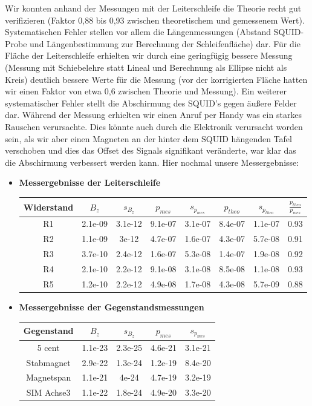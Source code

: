\documentclass[12pt]{article}
\begin{document}
Wir konnten anhand der Messungen mit der Leiterschleife die Theorie recht gut verifizieren (Faktor 0,88 bis 0,93 zwischen theoretischem und gemessenem Wert). Systematischen Fehler stellen vor allem die Längenmessungen (Abstand SQUID-Probe und Längenbestimmung zur Berechnung der Schleifenfläche) dar. Für die Fläche der Leiterschleife erhielten wir durch eine geringfügig bessere Messung (Messung mit Schiebelehre statt Lineal und Berechnung als Ellipse nicht als Kreis) deutlich bessere Werte für die Messung (vor der korrigierten Fläche hatten wir einen Faktor von etwa 0,6 zwischen Theorie und Messung). 
Ein weiterer systematischer Fehler stellt die Abschirmung des SQUID's gegen äußere Felder dar. Während der Messung erhielten wir einen Anruf per Handy was ein starkes Rauschen verursachte. Dies könnte auch durch die Elektronik verursacht worden sein, als wir aber einen Magneten an der hinter dem SQUID hängenden Tafel verschoben und dies das Offset des Signals signifikant veränderte, war klar das die Abschirmung verbessert werden kann.
Hier nochmal unsere Messergebnisse:
\begin{itemize}
 \item \textbf{Messergebnisse der Leiterschleife}
\begin{center}
\begin{tabular}{|c|cc|cc|cc|c|}
\hline
Widerstand & $B_z$ & $s_{B_z}$ & $p_{mes}$ & $s_{p_{mes}}$ & $p_{theo}$ & $s_{p_{theo}}$ & $\frac{p_{theo}}{p_{mes}}$ \\
\hline
R1 & 2.1e-09 & 3.1e-12 & 9.1e-07 & 3.1e-07 & 8.4e-07 & 1.1e-07 & 0.93 \\
R2 & 1.1e-09 & 3e-12 & 4.7e-07 & 1.6e-07 & 4.3e-07 & 5.7e-08 & 0.91 \\
R3 & 3.7e-10 & 2.4e-12 & 1.6e-07 & 5.3e-08 & 1.4e-07 & 1.9e-08 & 0.92 \\
R4 & 2.1e-10 & 2.2e-12 & 9.1e-08 & 3.1e-08 & 8.5e-08 & 1.1e-08 & 0.93 \\
R5 & 1.2e-10 & 2.2e-12 & 4.9e-08 & 1.7e-08 & 4.3e-08 & 5.7e-09 & 0.88 \\
\hline
\end{tabular}
\end{center}
\item \textbf{Messergebnisse der Gegenstandsmessungen}
\begin{center}
\begin{tabular}{|c|cc|cc|}
\hline
Gegenstand & $B_z$ & $s_{B_z}$ & $p_{mes}$ & $s_{p_{mes}}$ \\
\hline
5 cent & 1.1e-23 & 2.3e-25 & 4.6e-21 & 3.1e-21 \\
Stabmagnet & 2.9e-22 & 1.3e-24 & 1.2e-19 & 8.4e-20 \\
Magnetspan & 1.1e-21 & 4e-24 & 4.7e-19 & 3.2e-19 \\
SIM Achse3 & 1.1e-22 & 1.8e-24 & 4.9e-20 & 3.3e-20 \\
\hline
\end{tabular}
\end{center}
\end{itemize}
\end{document}
